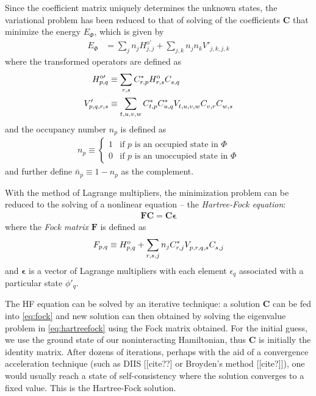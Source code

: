 \documentclass[amsmath, amssymb, aps, floatfix, nofootinbib, preprintnumbers,showpacs, superscriptaddress, twocolumn]{revtex4-1}
\begin{document}
Since the coefficient matrix uniquely determines the unknown states, the variational problem has been reduced to that of solving of the coefficients $\bm C$ that minimize the energy $E_{\Phi}$, which is given by
\begin{align}
  E_{\Phi} &= \sum_{j} n_j H^{\text{o} \prime}_{j, j} + \sum_{j, k} n_j n_k V'_{j, k, j, k} \label{eq:hfenergy}
\end{align}
where the transformed operators are defined as
\begin{align}
  H^{\text{o} \prime}_{p, q} &\equiv \sum_{r, s} C_{r, p}^* H_{r, s}^{\text o} C_{s, q}^{} \label{eq:hftransform1} \\
  V'_{p, q, r, s} &\equiv \sum_{t, u, v, w} C_{t, p}^* C_{u, q}^* V_{t, u, v, w}^{} C_{v, r}^{} C_{w, s}^{} \label{eq:hftransform2}
\end{align}
and the occupancy number $n_p$ is defined as
\begin{align}
  n_p \equiv \begin{cases}
    1 & \text{if $p$ is an occupied state in $\Phi$} \\
    0 & \text{if $p$ is an unoccupied state in $\Phi$}
  \end{cases}
\end{align}
and further define $\bar n_p \equiv 1 - n_p$ as the complement.

With the method of Lagrange multipliers, the minimization problem can be reduced to the solving of a nonlinear equation -- the \textit{Hartree-Fock equation}:
\begin{align} \label{eq:hartreefock}
  \bm F \bm C = \bm C \bm \epsilon
\end{align}
where the \textit{Fock matrix} $\bm F$ is defined as
\begin{align} \label{eq:fock}
  F_{p, q} \equiv H_{p, q}^{\text o} + \sum_{r, s, j} n_j C_{r, j}^* V_{p, r, q, s}^{} C_{s, j}^{}
\end{align}
and $\bm \epsilon$ is a vector of Lagrange multipliers with each element $\epsilon_q$ associated with a particular state $\phi'_q$.

The HF equation can be solved by an iterative technique: a solution $\bm C$ can be fed into \eqref{eq:fock} and new solution can then obtained by solving the eigenvalue problem in \eqref{eq:hartreefock} using the Fock matrix obtained.  For the initial guess, we use the ground state of our noninteracting Hamiltonian, thus $\bm C$ is initially the identity matrix.  After dozens of iterations, perhaps with the aid of a convergence acceleration technique (such as DIIS [[cite??] or Broyden's method [[cite?]]), one would usually reach a state of self-consistency where the solution converges to a fixed value.  This is the Hartree-Fock solution.
\end{document}
